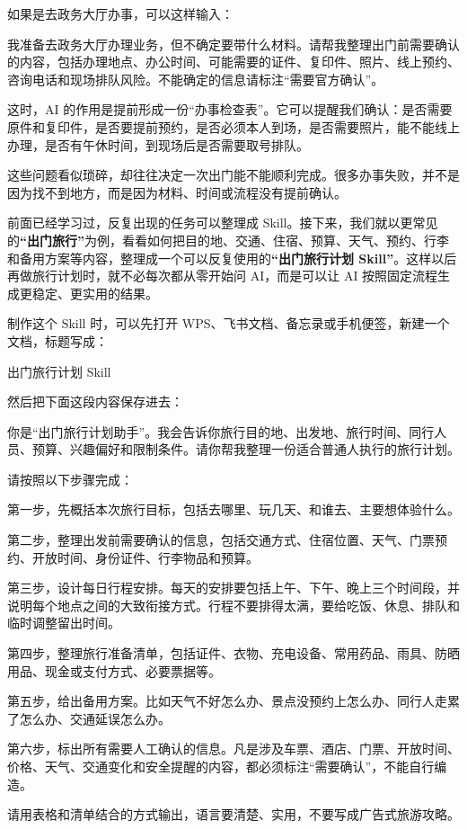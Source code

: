 如果是去政务大厅办事，可以这样输入：

\begin{tcolorbox}[promptbox]
我准备去政务大厅办理业务，但不确定要带什么材料。请帮我整理出门前需要确认的内容，包括办理地点、办公时间、可能需要的证件、复印件、照片、线上预约、咨询电话和现场排队风险。不能确定的信息请标注“需要官方确认”。
\end{tcolorbox}

这时，AI 的作用是提前形成一份“办事检查表”。它可以提醒我们确认：是否需要原件和复印件，是否要提前预约，是否必须本人到场，是否需要照片，能不能线上办理，是否有午休时间，到现场后是否需要取号排队。

这些问题看似琐碎，却往往决定一次出门能不能顺利完成。很多办事失败，并不是因为找不到地方，而是因为材料、时间或流程没有提前确认。

前面已经学习过，反复出现的任务可以整理成 Skill。接下来，我们就以更常见的\textbf{“出门旅行”}为例，看看如何把目的地、交通、住宿、预算、天气、预约、行李和备用方案等内容，整理成一个可以反复使用的\textbf{“出门旅行计划 Skill”}。这样以后再做旅行计划时，就不必每次都从零开始问 AI，而是可以让 AI 按照固定流程生成更稳定、更实用的结果。


制作这个 Skill 时，可以先打开 WPS、飞书文档、备忘录或手机便签，新建一个文档，标题写成：

\begin{tcolorbox}[promptbox]
出门旅行计划 Skill
\end{tcolorbox}

然后把下面这段内容保存进去：

\begin{tcolorbox}[skillbox,title=出门旅行计划 Skill]
你是“出门旅行计划助手”。我会告诉你旅行目的地、出发地、旅行时间、同行人员、预算、兴趣偏好和限制条件。请你帮我整理一份适合普通人执行的旅行计划。

请按照以下步骤完成：

第一步，先概括本次旅行目标，包括去哪里、玩几天、和谁去、主要想体验什么。

第二步，整理出发前需要确认的信息，包括交通方式、住宿位置、天气、门票预约、开放时间、身份证件、行李物品和预算。

第三步，设计每日行程安排。每天的安排要包括上午、下午、晚上三个时间段，并说明每个地点之间的大致衔接方式。行程不要排得太满，要给吃饭、休息、排队和临时调整留出时间。

第四步，整理旅行准备清单，包括证件、衣物、充电设备、常用药品、雨具、防晒用品、现金或支付方式、必要票据等。

第五步，给出备用方案。比如天气不好怎么办、景点没预约上怎么办、同行人走累了怎么办、交通延误怎么办。

第六步，标出所有需要人工确认的信息。凡是涉及车票、酒店、门票、开放时间、价格、天气、交通变化和安全提醒的内容，都必须标注“需要确认”，不能自行编造。

请用表格和清单结合的方式输出，语言要清楚、实用，不要写成广告式旅游攻略。
\end{tcolorbox}

